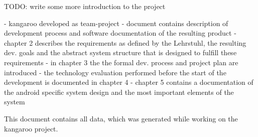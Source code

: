 TODO: write some more introduction to the project

- kangaroo developed as team-project
- document contains description of development process and software documentation of the resulting product
- chapter 2 describes the requirements as defined by the Lehrstuhl, the resulting dev. goals and the abstract system structure that is designed to fulfill these requirements
- in chapter 3 the the formal dev. process and project plan are introduced
- the technology evaluation performed before the start of the development is documented in chapter 4
- chapter 5 contains a documentation of the android specific system design and the most important elements of the system   

This document contains all data, which was generated while
working on the kangaroo project.
